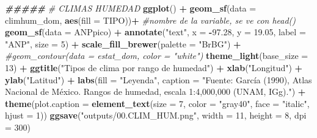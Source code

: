 \documentclass[
  11pt,
  letterpaper,
  DIV=11,
  numbers=noendperiod]{scrartcl}
\newenvironment{Shaded}{\begin{snugshade}}{\end{snugshade}}
\newcommand{\AttributeTok}[1]{\textcolor[rgb]{0.13,0.29,0.53}{#1}}
\newcommand{\CommentTok}[1]{\textcolor[rgb]{0.56,0.35,0.01}{\textit{#1}}}
\newcommand{\DecValTok}[1]{\textcolor[rgb]{0.00,0.00,0.81}{#1}}
\newcommand{\DocumentationTok}[1]{\textcolor[rgb]{0.56,0.35,0.01}{\textbf{\textit{#1}}}}
\newcommand{\FloatTok}[1]{\textcolor[rgb]{0.00,0.00,0.81}{#1}}
\newcommand{\FunctionTok}[1]{\textcolor[rgb]{0.13,0.29,0.53}{\textbf{#1}}}
\newcommand{\NormalTok}[1]{#1}
\newcommand{\SpecialCharTok}[1]{\textcolor[rgb]{0.81,0.36,0.00}{\textbf{#1}}}
\newcommand{\StringTok}[1]{\textcolor[rgb]{0.31,0.60,0.02}{#1}}
\begin{document}
\begin{Shaded}
\begin{Highlighting}[numbers=left,,]
\DocumentationTok{\#\#\#\#\#}
\CommentTok{\# CLIMAS HUMEDAD}
\FunctionTok{ggplot}\NormalTok{() }\SpecialCharTok{+}
  \FunctionTok{geom\_sf}\NormalTok{(}\AttributeTok{data =}\NormalTok{ climhum\_dom, }\FunctionTok{aes}\NormalTok{(}\AttributeTok{fill =}\NormalTok{ TIPO))}\SpecialCharTok{+} \CommentTok{\#nombre de la variable, se ve con head()}
  \FunctionTok{geom\_sf}\NormalTok{(}\AttributeTok{data =}\NormalTok{ ANPpico) }\SpecialCharTok{+}
  \FunctionTok{annotate}\NormalTok{(}\StringTok{"text"}\NormalTok{, }\AttributeTok{x =} \SpecialCharTok{{-}}\FloatTok{97.28}\NormalTok{, }\AttributeTok{y =} \FloatTok{19.05}\NormalTok{, }\AttributeTok{label =} \StringTok{"ANP"}\NormalTok{, }\AttributeTok{size =} \DecValTok{5}\NormalTok{) }\SpecialCharTok{+}
  \FunctionTok{scale\_fill\_brewer}\NormalTok{(}\AttributeTok{palette =} \StringTok{"BrBG"}\NormalTok{) }\SpecialCharTok{+}
  \CommentTok{\#geom\_contour(data = estat\_dom, color = "white")}
  \FunctionTok{theme\_light}\NormalTok{(}\AttributeTok{base\_size =} \DecValTok{13}\NormalTok{) }\SpecialCharTok{+}
  \FunctionTok{ggtitle}\NormalTok{(}\StringTok{"Tipos de clima por rango de humedad"}\NormalTok{) }\SpecialCharTok{+} \FunctionTok{xlab}\NormalTok{(}\StringTok{"Longitud"}\NormalTok{) }\SpecialCharTok{+} \FunctionTok{ylab}\NormalTok{(}\StringTok{"Latitud"}\NormalTok{) }\SpecialCharTok{+}
  \FunctionTok{labs}\NormalTok{(}\AttributeTok{fill =} \StringTok{"Leyenda"}\NormalTok{,}
       \AttributeTok{caption =} \StringTok{"Fuente: García (1990), Atlas Nacional de México.}
\StringTok{       Rangos de humedad, escala 1:4,000,000 (UNAM, IGg)."}\NormalTok{) }\SpecialCharTok{+}
  \FunctionTok{theme}\NormalTok{(}\AttributeTok{plot.caption =} \FunctionTok{element\_text}\NormalTok{(}\AttributeTok{size =} \DecValTok{7}\NormalTok{, }\AttributeTok{color =} \StringTok{"gray40"}\NormalTok{, }\AttributeTok{face =} \StringTok{"italic"}\NormalTok{, }\AttributeTok{hjust =} \DecValTok{1}\NormalTok{))}
\FunctionTok{ggsave}\NormalTok{(}\StringTok{"outputs/00.CLIM\_HUM.png"}\NormalTok{, }\AttributeTok{width =} \DecValTok{11}\NormalTok{, }\AttributeTok{height =} \DecValTok{8}\NormalTok{, }\AttributeTok{dpi =} \DecValTok{300}\NormalTok{)}


\end{Highlighting}
\end{Shaded}
\end{document}
